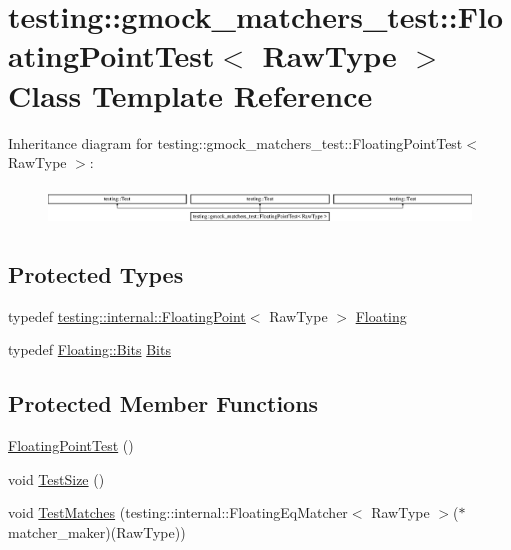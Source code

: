 \hypertarget{classtesting_1_1gmock__matchers__test_1_1_floating_point_test}{}\section{testing\+::gmock\+\_\+matchers\+\_\+test\+::Floating\+Point\+Test$<$ Raw\+Type $>$ Class Template Reference}
\label{classtesting_1_1gmock__matchers__test_1_1_floating_point_test}
Inheritance diagram for testing\+::gmock\+\_\+matchers\+\_\+test\+::Floating\+Point\+Test$<$ Raw\+Type $>$\+:\begin{figure}[H]
\begin{center}
\leavevmode
\includegraphics[height=1.037037cm]{de/d25/classtesting_1_1gmock__matchers__test_1_1_floating_point_test}
\end{center}
\end{figure}
\subsection*{Protected Types}
\begin{DoxyCompactItemize}
\item 
typedef \mbox{\hyperlink{classtesting_1_1internal_1_1_floating_point}{testing\+::internal\+::\+Floating\+Point}}$<$ Raw\+Type $>$ \mbox{\hyperlink{classtesting_1_1gmock__matchers__test_1_1_floating_point_test_ae1459f93e1b18426625daf4fa98e80c6}{Floating}}
\item 
typedef \mbox{\hyperlink{classtesting_1_1internal_1_1_floating_point_abf228bf6cd48f12c8b44c85b4971a731}{Floating\+::\+Bits}} \mbox{\hyperlink{classtesting_1_1gmock__matchers__test_1_1_floating_point_test_addf899bd832ae51103198d201d2f2ea2}{Bits}}
\end{DoxyCompactItemize}
\subsection*{Protected Member Functions}
\begin{DoxyCompactItemize}
\item 
\mbox{\hyperlink{classtesting_1_1gmock__matchers__test_1_1_floating_point_test_af2fb52db3abf63903d78541c4c3a17d3}{Floating\+Point\+Test}} ()
\item 
void \mbox{\hyperlink{classtesting_1_1gmock__matchers__test_1_1_floating_point_test_ad6f8f0f5c939b7447a5717620b728018}{Test\+Size}} ()
\item 
void \mbox{\hyperlink{classtesting_1_1gmock__matchers__test_1_1_floating_point_test_a69d14d66bbd82f6b8bbe985046b59538}{Test\+Matches}} (testing\+::internal\+::\+Floating\+Eq\+Matcher$<$ Raw\+Type $>$($\ast$matcher\+\_\+maker)(Raw\+Type))
\end{DoxyCompactItemize}
